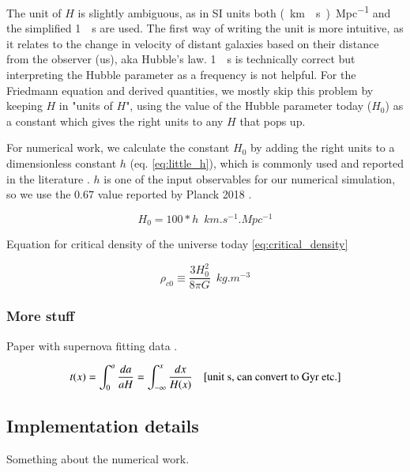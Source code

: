 The unit of $H$ is slightly ambiguous, as in SI units both \unit{(km \per s)\per Mpc} and the simplified \unit{1 \per s} are used. The first way of writing the unit is more intuitive, as it relates to the change in velocity of distant galaxies based on their distance from the observer (us), aka Hubble's law. \unit{1 \per s} is technically correct but interpreting the Hubble parameter as a frequency is not helpful. For the Friedmann equation and derived quantities, we mostly skip this problem by keeping $H$ in "units of $H$", using the value of the Hubble parameter today ($H_0$) as a constant which gives the right units to any $H$ that pops up.

For numerical work, we calculate the constant $H_0$ by adding the right units to a dimensionless constant $h$ (eq. \ref{eq:little_h}), which is commonly used and reported in the literature \citep{crotonDamnYouLittle2013}. $h$ is one of the input observables for our numerical simulation, so we use the $0.67$ value reported by Planck 2018 \citep{collaborationPlanck2018Results2020}.

\begin{equation}\label{eq:little_h}
H_0 = 100 * h \enspace \unit{km.s^{-1}.Mpc^{-1}}
\end{equation}

Equation for critical density of the universe today \ref{eq:critical_density}

\begin{equation}\label{eq:critical_density}
\rho_{c0} \equiv \frac{3H_0^2}{8\pi G} \enspace \unit{kg.m^{-3}}
\end{equation}

\subsubsection{More stuff}

Paper with supernova fitting data \citet{betouleImprovedCosmologicalConstraints2014}.

\begin{equation}\label{eq:t_of_x}
t(x) = \int_0^a \frac{da}{aH} = \int_{-\infty}^x \frac{dx}{H(x)} \quad [\text{unit \unit{s}, can convert to \unit{\giga yr} etc.}]
\end{equation}

\subsection{Implementation details}
Something about the numerical work.

